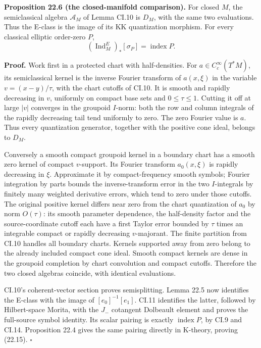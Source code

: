 \documentclass[
  11pt,
]{article}
\begin{document}
\textbf{Proposition 22.6 (the closed-manifold comparison).} For closed
\(M\), the semiclassical algebra \(\mathcal A_M\) of Lemma CI.10 is
\(D_M\), with the same two evaluations. Thus the E-class is the image of
its KK quantization morphism. For every classical elliptic order-zero
\(P\), \[
(\operatorname{Ind}^E_M)_*[\sigma_P]
=\operatorname{index}P.
\tag{22.15}
\]

\textbf{Proof.} Work first in a protected chart with half-densities. For
\(a\in C_c^\infty(T^*M)\), its semiclassical kernel is the inverse
Fourier transform of \(a(x,\xi)\) in the variable \(v=(x-y)/\tau\), with
the chart cutoffs of CI.10. It is smooth and rapidly decreasing in
\(v\), uniformly on compact base sets and \(0\leq\tau\leq1\). Cutting it
off at large \(|v|\) converges in the groupoid \(I\)-norm: both the row
and column integrals of the rapidly decreasing tail tend uniformly to
zero. The zero Fourier value is \(a\). Thus every quantization
generator, together with the positive cone ideal, belongs to \(D_M\).

Conversely a smooth compact groupoid kernel in a boundary chart has a
smooth zero kernel of compact \(v\)-support. Its Fourier transform
\(a_0(x,\xi)\) is rapidly decreasing in \(\xi\). Approximate it by
compact-frequency smooth symbols; Fourier integration by parts bounds
the inverse-transform error in the two \(I\)-integrals by finitely many
weighted derivative errors, which tend to zero under those cutoffs. The
original positive kernel differs near zero from the chart quantization
of \(a_0\) by norm \(O(\tau)\): its smooth parameter dependence, the
half-density factor and the source-coordinate cutoff each have a first
Taylor error bounded by \(\tau\) times an integrable compact or rapidly
decreasing \(v\)-majorant. The finite partition from CI.10 handles all
boundary charts. Kernels supported away from zero belong to the already
included compact cone ideal. Smooth compact kernels are dense in the
groupoid completion by chart convolution and compact cutoffs. Therefore
the two closed algebras coincide, with identical evaluations.

CI.10's coherent-vector section proves semisplitting. Lemma 22.5 now
identifies the E-class with the image of \([e_0]^{-1}[e_1]\). CI.11
identifies the latter, followed by Hilbert-space Morita, with the
\(J_-\) cotangent Dolbeault element and proves the full-source symbol
identity. Its scalar pairing is exactly \(\operatorname{index}P\), by
CI.9 and CI.14. Proposition 22.4 gives the same pairing directly in
K-theory, proving (22.15). \(\square\)
\end{document}
